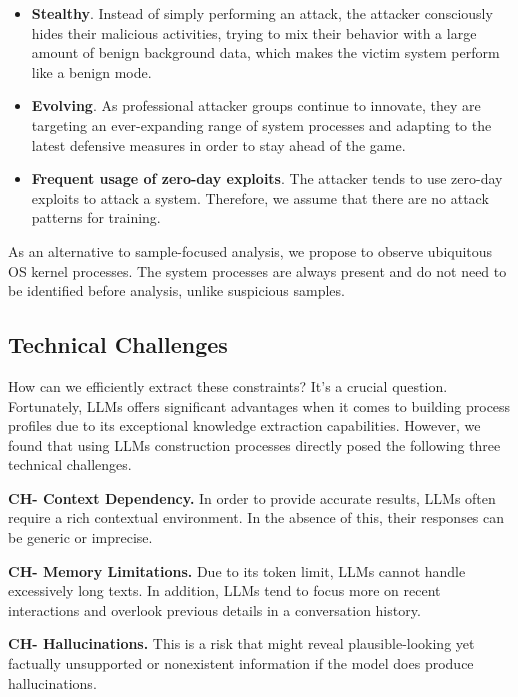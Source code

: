 \begin{itemize}
    \item \textbf{Stealthy}. Instead of simply performing an attack, the attacker consciously hides their malicious activities, trying to mix their behavior with a large amount of benign background data, which makes the victim system perform like a benign mode.
    \item \textbf{Evolving}. As professional attacker groups continue to innovate, they are targeting an ever-expanding range of system processes and adapting to the latest defensive measures in order to stay ahead of the game. 
    \item \textbf{Frequent usage of zero-day exploits}. The attacker tends to use zero-day exploits to attack a system. Therefore, we assume that there are no attack patterns for training.
\end{itemize}
As an alternative to sample-focused analysis, we propose to observe ubiquitous OS kernel processes. The system processes are always present and do not need to be identified before analysis, unlike suspicious samples.

\subsection{Technical Challenges}

How can we efficiently extract these constraints? It's a crucial question. Fortunately, LLMs offers significant advantages when it comes to building process profiles due to its exceptional knowledge extraction capabilities.
However, we found that using LLMs construction processes directly posed the following three technical challenges.


\noindent
{\bf CH- Context Dependency.} %
In order to provide accurate results, LLMs often require a rich contextual environment. In the absence of this, their responses can be generic or imprecise. 

\noindent
{\bf CH- Memory Limitations.} %
Due to its token limit, LLMs cannot handle excessively long texts. In addition, LLMs tend to focus more on recent interactions and overlook previous details in a conversation history. 

\noindent
{\bf CH- Hallucinations.} %
This is a risk that might reveal plausible-looking yet factually unsupported or nonexistent information if the model does produce hallucinations. 

